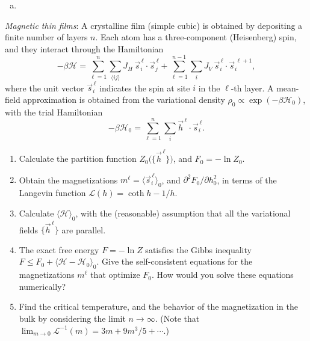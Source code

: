 \begin{solution}
    \begin{enumerate}[(a)]
        \item
    \end{enumerate}
\end{solution}

\begin{problem}
    \textit{Magnetic thin films}: A crystalline film (simple cubic) is obtained by depositing a finite number of layers $n$. Each atom has a three-component (Heisenberg) spin, and they interact through the Hamiltonian
    \[
        -\beta\mathcal{H} = \sum_{\ell=1}^{n}\sum_{\langle ij\rangle} J_H\,\vec{s}_i^{\,\ell}\cdot\vec{s}_j^{\,\ell} + \sum_{\ell=1}^{n-1}\sum_i J_V\,\vec{s}_i^{\,\ell}\cdot\vec{s}_i^{\,\ell+1},
    \]
    where the unit vector $\vec{s}_i^{\,\ell}$ indicates the spin at site $i$ in the $\ell$-th layer. A mean-field approximation is obtained from the variational density $\rho_0 \propto \exp(-\beta\mathcal{H}_0)$, with the trial Hamiltonian
    \[
        -\beta\mathcal{H}_0 = \sum_{\ell=1}^{n}\sum_i \vec{h}^{\,\ell}\cdot\vec{s}_i^{\,\ell}.
    \]

    \begin{enumerate}
        \item[(a)] Calculate the partition function $Z_0\bigl(\{\vec{h}^{\,\ell}\}\bigr)$, and $F_0 = -\ln Z_0$.

        \item[(b)] Obtain the magnetizations $m^\ell = \langle\vec{s}_i^{\,\ell}\rangle_0$, and $\partial^2 F_0/\partial h_0^2$, in terms of the Langevin function $\mathcal{L}(h) = \coth h - 1/h$.

        \item[(c)] Calculate $\langle\mathcal{H}\rangle_0$, with the (reasonable) assumption that all the variational fields $\{\vec{h}^{\,\ell}\}$ are parallel.

        \item[(d)] The exact free energy $F = -\ln Z$ satisfies the Gibbs inequality $F \leq F_0 + \langle\mathcal{H} - \mathcal{H}_0\rangle_0$. Give the self-consistent equations for the magnetizations $m^\ell$ that optimize $F_0$. How would you solve these equations numerically?

        \item[(e)] Find the critical temperature, and the behavior of the magnetization in the bulk by considering the limit $n \to \infty$. (Note that $\lim_{m\to 0}\mathcal{L}^{-1}(m) = 3m + 9m^3/5 + \cdots$.)


\end{enumerate}
\end{problem}
